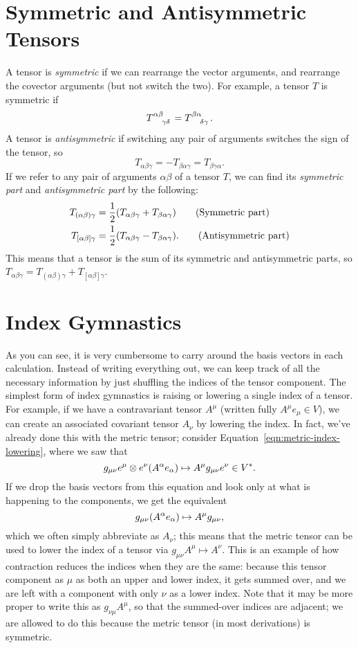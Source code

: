 \section{Symmetric and Antisymmetric Tensors}
A tensor is \emph{symmetric} if we can rearrange the vector arguments, and rearrange the covector arguments (but not switch the two).
For example, a tensor $T$ is symmetric if
\[ \tensor{T}{^{\alpha\beta}_{\gamma\delta}} = \tensor{T}{^{\beta\alpha}_{\delta\gamma}}. \]
A tensor is \emph{antisymmetric} if switching any pair of arguments switches the sign of the tensor, so 
\[ T_{\alpha\beta\gamma} = -T_{\beta\alpha\gamma} = T_{\beta\gamma\alpha}. \]
If we refer to any pair of arguments $\alpha\beta$ of a tensor $T$, we can find its \emph{symmetric part} and \emph{antisymmetric part} by the following:
\begin{align*}
    T_{(\alpha\beta)\gamma} &= \frac{1}{2}\qty(T_{\alpha\beta\gamma} + T_{\beta\alpha\gamma}) \tag{Symmetric part} \\
    T_{[\alpha\beta]\gamma} &= \frac{1}{2}\qty(T_{\alpha\beta\gamma} - T_{\beta\alpha\gamma}). \tag{Antisymmetric part}
\end{align*}
This means that a tensor is the sum of its symmetric and antisymmetric parts, so $T_{\alpha\beta\gamma} = T_{(\alpha\beta)\gamma} + T_{[\alpha\beta]\gamma}$.

\section{Index Gymnastics}
As you can see, it is very cumbersome to carry around the basis vectors in each calculation.
Instead of writing everything out, we can keep track of all the necessary information by just shuffling the indices of the tensor component.
The simplest form of index gymnastics is raising or lowering a single index of a tensor.
For example, if we have a contravariant tensor $A^\mu$ (written fully $A^\mu e_\mu \in V$), we can create an associated covariant tensor $A_\nu$ by lowering the index.
In fact, we've already done this with the metric tensor; consider Equation~\eqref{eqn:metric-index-lowering}, where we saw that
\[ g_{\mu\nu} e^\mu \otimes e^\nu \qty(A^\alpha e_\alpha) \mapsto A^\mu g_{\mu\nu} e^\nu \in V^*. \]
If we drop the basis vectors from this equation and look only at what is happening to the components, we get the equivalent 
\[ g_{\mu\nu}\qty(A^\alpha e_\alpha) \mapsto A^\mu g_{\mu\nu}, \]
which we often simply abbreviate as $A_\nu$; this means that the metric tensor can be used to lower the index of a tensor via $g_{\mu\nu}A^\mu \mapsto A^\nu$.
This is an example of how contraction reduces the indices when they are the same: because this tensor component as $\mu$ as both an upper and lower index, it gets summed over, and we are left with a component with only $\nu$ as a lower index.
Note that it may be more proper to write this as $g_{\nu\mu}A^\mu$, so that the summed-over indices are adjacent; we are allowed to do this because the metric tensor (in most derivations) is symmetric.

